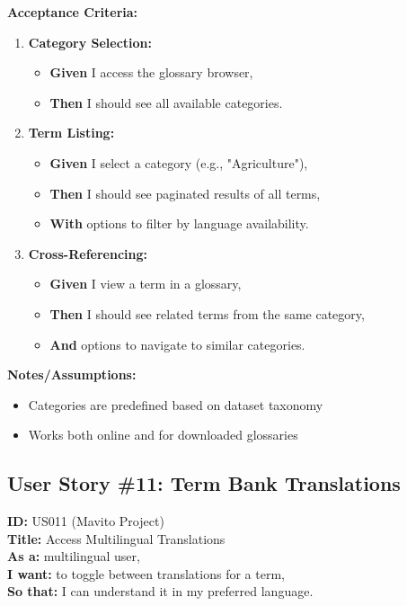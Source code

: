 \documentclass[12pt]{article}
\begin{document}
\vspace{1em}
\textbf{Acceptance Criteria:}
\begin{enumerate}
    \item \textbf{Category Selection:}
    \begin{itemize}
        \item \textbf{Given} I access the glossary browser,
        \item \textbf{Then} I should see all available categories.
    \end{itemize}

    \item \textbf{Term Listing:}
    \begin{itemize}
        \item \textbf{Given} I select a category (e.g., "Agriculture"),
        \item \textbf{Then} I should see paginated results of all terms,
        \item \textbf{With} options to filter by language availability.
    \end{itemize}

    \item \textbf{Cross-Referencing:}
    \begin{itemize}
        \item \textbf{Given} I view a term in a glossary,
        \item \textbf{Then} I should see related terms from the same category,
        \item \textbf{And} options to navigate to similar categories.
    \end{itemize}
\end{enumerate}

\vspace{1em}
\textbf{Notes/Assumptions:}
\begin{itemize}
    \item Categories are predefined based on dataset taxonomy
    \item Works both online and for downloaded glossaries
\end{itemize}

\subsection{User Story \#11: Term Bank Translations}
\textbf{ID:} US011 (Mavito Project) \\
\textbf{Title:} Access Multilingual Translations \\
\textbf{As a:} multilingual user, \\
\textbf{I want:} to toggle between translations for a term, \\
\textbf{So that:} I can understand it in my preferred language.
\end{document}
